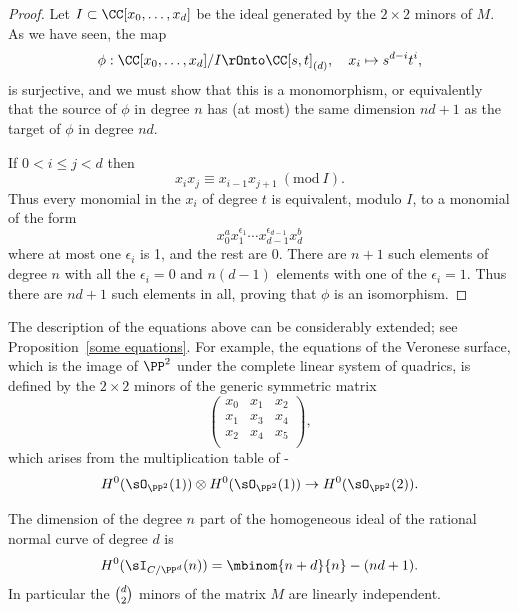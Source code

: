 \begin{proof}
Let $I\subset \CC[x_0,\dots, x_d]$ be the ideal generated by the $2\times 2$ minors of $M$.
As we have seen, the map
$$
\phi: \CC[x_0, \dots, x_d]/I \rOnto \CC[s,t]_{(d)},\quad x_i\mapsto s^{d-i}t^i,
$$
is surjective, and we must show that this is a monomorphism, or equivalently that the source of $\phi$ in degree $n$ has
(at most) the same dimension $nd+1$ as the target of $\phi$ in degree $nd$.

If $0<i\leq j<d$ then
$$
x_ix_j \equiv x_{i-1}x_{j+1}  \ (\mathrm{ mod}\ I).
$$
Thus every monomial in the $x_i$ of degree $t$ is equivalent, modulo $I$, to a monomial of the form
 $$
 x_0^ax_1^{\epsilon_1}\cdots x_{d-1}^{\epsilon_{d-1}}x_d^b
 $$
 where at most one $\epsilon_i$ is 1, and the rest are 0. There are $n+1$ such elements of degree $n$ with all the $\epsilon_i = 0$
 and $n(d-1)$ elements with one of the $\epsilon_i = 1$. Thus there are $nd+1$ such elements in all, proving that $\phi$ is
 an isomorphism.
  \end{proof}

\begin{fact}\label{Veronese equations fact}
The description of the equations above can be considerably extended;
see Proposition~\ref{some equations}. For example, the equations of the
%
Veronese surface, which is the image of $\PP^{2}$
 under the complete linear system of quadrics, is defined by the $2\times 2$ minors of the generic
 symmetric matrix
 $$
 \begin{pmatrix}
 x_{0}&x_{1}&x_{2}\\
  x_{1}&x_{3}&x_{4}\\
   x_{2}&x_{4}&x_{5}\\
\end{pmatrix}
,
$$
which arises from the multiplication table of
\belowdisplayskip-\baselineskip
$$
H^{0}(\sO_{\PP^{2}}(1)) \otimes H^{0}(\sO_{\PP^{2}}(1)) \to H^{0}(\sO_{\PP^{2}}(2)).
$$
\end{fact}

\vspace*{3pt}

\begin{corollary}\label{forms vanishing on the RNC}
The dimension of the degree $n$ part of the homogeneous ideal of the
rational normal curve
%
of degree $d$ is
$$
H^0(\sI_{C/\PP^d}(n)) = \mbinom{n+d}{n} - (nd+1).
$$
In particular
the $\tbinom{d}{ 2}$ minors of the matrix $M$ are linearly independent.
\end{corollary}

